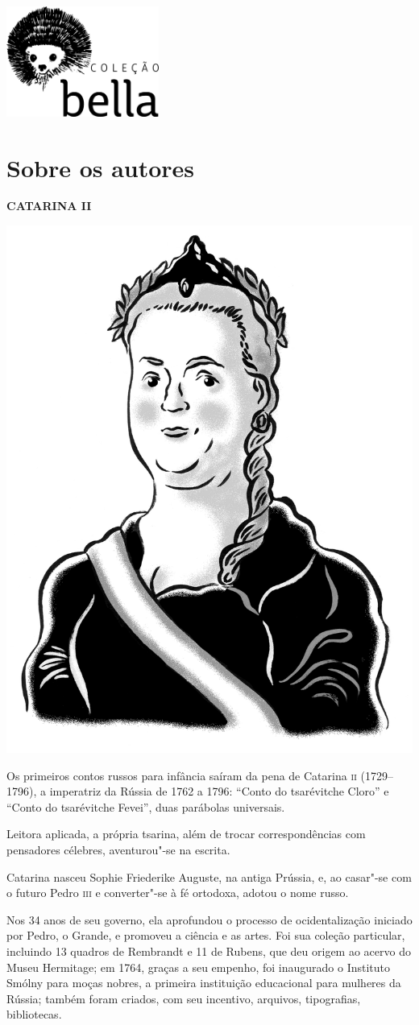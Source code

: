 \blankpage
\thispagestyle{empty}
\vspace*{\fill}
\begin{center}
\includegraphics[width=5cm]{./imgs/bella.jpg}
\end{center}
\vspace*{\fill}

\pagestyle{plain}
\chapter{Sobre os autores}\label{part16}

\begingroup\small

\textbf{CATARINA II }\medskip

\noindent\includegraphics[width=.8in]{./imgs/autor1.jpg}

\noindent{}Os primeiros contos russos para infância saíram da pena de Catarina \textsc{ii}
(1729--1796), a imperatriz da Rússia de 1762 a 1796: ``Conto do
tsarévitche Cloro'' e ``Conto do tsarévitche Fevei'', duas parábolas universais.

Leitora aplicada, a própria tsarina, além de trocar correspondências com
pensadores célebres, aventurou"-se na escrita.

Catarina nasceu Sophie Friederike Auguste, na antiga Prússia, e, ao
casar"-se com o futuro Pedro \textsc{iii} e converter"-se à fé ortodoxa, adotou o nome
russo.

Nos 34 anos de seu governo, ela aprofundou o processo de ocidentalização
iniciado por Pedro, o Grande, e promoveu a ciência e as artes. Foi sua
coleção particular, incluindo 13 quadros de Rembrandt e 11 de Rubens,
que deu origem ao acervo do Museu Hermitage; em 1764, graças a seu
empenho, foi inaugurado o Instituto Smólny para moças nobres, a primeira
instituição educacional para mulheres da Rússia; também foram criados,
com seu incentivo, arquivos, tipografias, bibliotecas.

